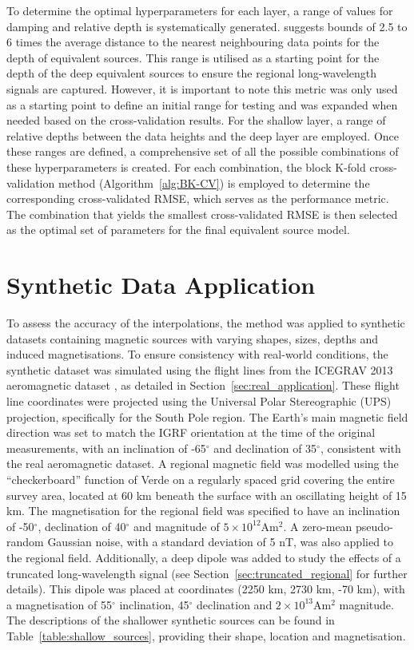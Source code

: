 To determine the optimal hyperparameters for each layer, a range of values for damping and relative depth is systematically generated. \citet{Dampney1969} suggests bounds of 2.5 to 6 times the average distance to the nearest neighbouring data points for the depth of equivalent sources. This range is utilised as a starting point for the depth of the deep equivalent sources to ensure the regional long-wavelength signals are captured. However, it is important to note this metric was only used as a starting point to define an initial range for testing and was expanded when needed based on the cross-validation results. For the shallow layer, a range of relative depths between the data heights and the deep layer are employed. Once these ranges are defined, a comprehensive set of all the possible combinations of these hyperparameters is created. For each combination, the block K-fold cross-validation method (Algorithm~\ref{alg:BK-CV}) is employed to determine the corresponding cross-validated RMSE, which serves as the performance metric. The combination that yields the smallest cross-validated RMSE is then selected as the optimal set of parameters for the final equivalent source model.


\section{Synthetic Data Application}

To assess the accuracy of the interpolations, the method was applied to synthetic datasets containing magnetic sources with varying shapes, sizes, depths and induced magnetisations. To ensure consistency with real-world conditions, the synthetic dataset was simulated using the flight lines from the ICEGRAV 2013 aeromagnetic dataset \citep{ICEGRAV_data}, as detailed in Section~\ref{sec:real_application}. These flight line coordinates were projected using the Universal Polar Stereographic (UPS) projection, specifically for the South Pole region. The Earth's main magnetic field direction was set to match the IGRF orientation at the time of the original measurements, with an inclination of -65$^\circ$ and declination of 35$^\circ$, consistent with the real aeromagnetic dataset. A regional magnetic field was modelled using the ``checkerboard'' function of Verde  \citep{verde} on a regularly spaced grid covering the entire survey area, located at 60 km beneath the surface with an oscillating height of 15 km. The magnetisation for the regional field was specified to have an inclination of -50$^\circ$, declination of 40$^\circ$ and magnitude of $5 \times 10^{12}$Am$^2$. A zero-mean pseudo-random Gaussian noise, with a standard deviation of 5 nT, was also applied to the regional field. Additionally, a deep dipole was added to study the effects of a truncated long-wavelength signal (see Section~\ref{sec:truncated_regional} for further details). This dipole was placed at coordinates (2250 km, 2730 km, -70 km), with a magnetisation of 55$^\circ$ inclination, 45$^\circ$ declination and $2 \times 10^{13}$Am$^2$ magnitude. The descriptions of the shallower synthetic sources can be found in Table~\ref{table:shallow_sources}, providing their shape, location and magnetisation.

